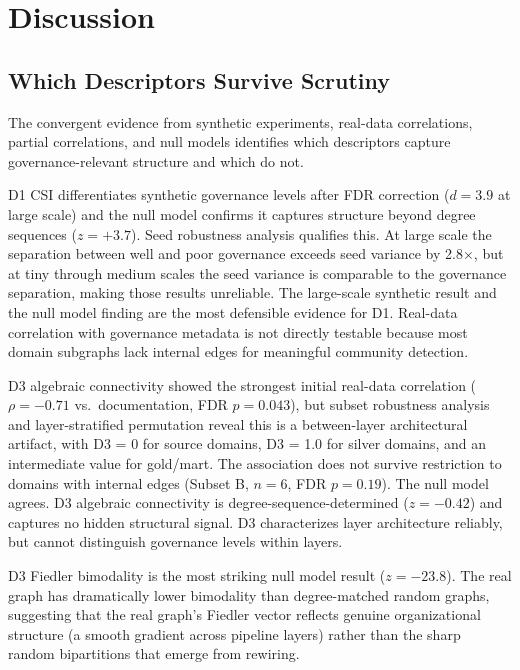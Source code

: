 \documentclass[11pt,a4paper]{article}
\begin{document}
\section{Discussion}

\subsection{Which Descriptors Survive Scrutiny}

The convergent evidence from synthetic experiments, real-data
correlations, partial correlations, and null models identifies which
descriptors capture governance-relevant structure and which do not.

D1 CSI differentiates synthetic governance levels after FDR correction
($d = 3.9$ at large scale) and the null model confirms it captures
structure beyond degree sequences ($z = +3.7$). Seed robustness
analysis qualifies this. At large scale the separation between well
and poor governance exceeds seed variance by 2.8×, but at tiny through
medium scales the seed variance is comparable to the governance
separation, making those results unreliable. The large-scale synthetic
result and the null model finding are the most defensible evidence for
D1. Real-data correlation with governance metadata is not directly
testable because most domain subgraphs lack internal edges for
meaningful community detection.

D3 algebraic connectivity showed the strongest initial real-data
correlation ($\rho = -0.71$ vs.\ documentation, FDR $p = 0.043$), but
subset robustness analysis and layer-stratified permutation reveal this
is a between-layer architectural artifact, with D3 = 0 for source
domains, D3 = 1.0 for silver domains, and an intermediate value for
gold/mart. The association
does not survive restriction to domains with internal edges (Subset B,
$n = 6$, FDR $p = 0.19$). The null model agrees. D3 algebraic
connectivity is degree-sequence-determined ($z = -0.42$) and captures no
hidden structural signal. D3 characterizes layer architecture reliably,
but cannot distinguish governance levels within layers.

D3 Fiedler bimodality is the most striking null model result ($z = -23.8$).
The real graph has dramatically lower bimodality than degree-matched
random graphs, suggesting that the real graph's Fiedler vector reflects
genuine organizational structure (a smooth gradient across pipeline
layers) rather than the sharp random bipartitions that emerge from
rewiring.
\end{document}
